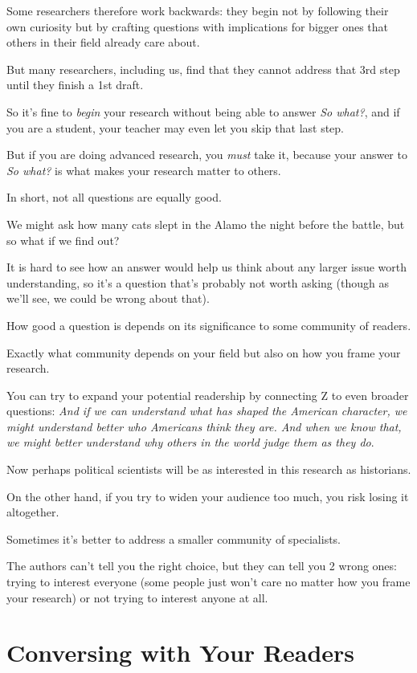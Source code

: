 \documentclass[oneside]{book}
\numberwithin{equation}{section}
\begin{document}
Some researchers therefore work backwards: they begin not by following their own curiosity but by crafting questions with implications for bigger ones that others in their field already care about.

But many researchers, including us, find that they cannot address that 3rd step until they finish a 1st draft.

So it's fine to \textit{begin} your research without being able to answer \textit{So what?}, and if you are a student, your teacher may even let you skip that last step.

But if you are doing advanced research, you \textit{must} take it, because your answer to \textit{So what?} is what makes your research matter to others.

%
In short, not all questions are equally good.

We might ask how many cats slept in the Alamo the night before the battle, but so what if we find out?

It is hard to see how an answer would help us think about any larger issue worth understanding, so it's a question that's probably not worth asking (though as we'll see, we could be wrong about that).

%
How good a question is depends on its significance to some community of readers.

Exactly what community depends on your field but also on how you frame your research.

You can try to expand your potential readership by connecting Z to even broader questions: \textit{And if we can understand what has shaped the American character, we might understand better who Americans think they are. And when we know that, we might better understand why others in the world judge them as they do}.

Now perhaps political scientists will be as interested in this research as historians.

On the other hand, if you try to widen your audience too much, you risk losing it altogether.

Sometimes it's better to address a smaller community of specialists.

%
The authors can't tell you the right choice, but they can tell you 2 wrong ones: trying to interest everyone (some people just won't care no matter how you frame your research) or not trying to interest anyone at all.

\section{Conversing with Your Readers}
\end{document}
